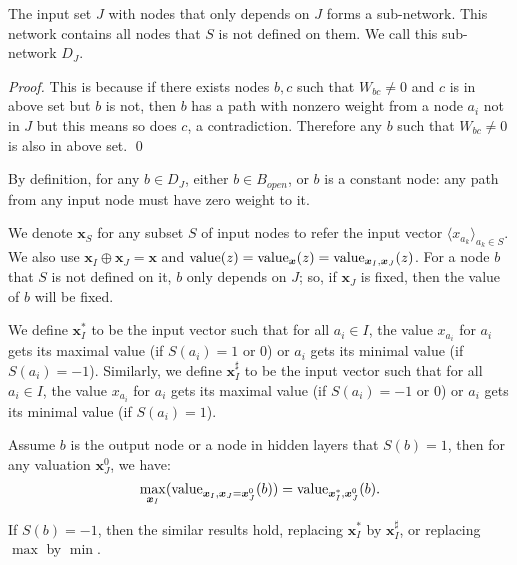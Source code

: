 			\begin{lemma}\label{lem:subnetwork2}
				The input set $J$ with nodes that only depends on $J$ forms a sub-network. This network contains all nodes that $S$ is not defined on them. We call this sub-network $D_J$.
			\end{lemma}
			
			\begin{proof}
				This is because if there exists nodes $b,c$ such that $W_{bc}\neq 0$ and $c$ is in above set but $b$ is not, then $b$ has a path with nonzero weight from a node $a_i$ not in $J$ but this means so does $c$, a contradiction. Therefore any $b$ such that $W_{bc}\neq 0$ is also in above set. \qed
			\end{proof}
			
			By definition, for any $b\in D_J$, either $b\in B_{open}$, or $b$ is a constant node:  any path from any input node must have zero weight to it.
			
			We denote $\boldsymbol{x}_S$ for any subset $S$ of input nodes to refer the input vector $\langle x_{a_k}\rangle_{a_k\in S}$. We also use $\boldsymbol{x}_I\oplus \boldsymbol{x}_J = \boldsymbol{x}$ and ${\textrm{value}}(z)={\textrm{value}}_{\boldsymbol{x}}(z)={\textrm{value}}_{\boldsymbol{x}_I,\boldsymbol{x}_J} (z)$. For a node $b$ that $S$ is not defined on it, $b$ only depends on $J$; so, if $\boldsymbol{x}_J$ is fixed, then the value of $b$ will be fixed.
			
			We define $\boldsymbol{x}_I^*$ to be the input vector such that for all $a_i \in I$, the value $x_{a_i}$ for $a_i$ gets its maximal value (if $S(a_i)=1$ or $0$) or $a_i$ gets its minimal value (if $S(a_i)=-1$). Similarly, we define $\boldsymbol{x}_I^\sharp$ to be the input vector such that for all $a_i \in I$, the value $x_{a_i}$ for $a_i$ gets its maximal value (if $S(a_i)=-1$ or $0$) or $a_i$ gets its minimal value (if $S(a_i)=1$).
			
			
			
			\begin{lemma} \label{lem:reach_max_2}
				
				Assume $b$ is the output node or a node in hidden layers that $S(b)=1$, then   for any valuation $\boldsymbol{x}^0_J$, 
				we have: $$\max_{\boldsymbol{x}_I} ({\textrm{value}}_{\boldsymbol{x}_I,\boldsymbol{x}_J=\boldsymbol{x}^0_J}(b)) =  {\textrm{value}}_{\boldsymbol{x}_I^*,\boldsymbol{x}^0_J}(b).$$
				
				
				
				
				
				If $S(b)=-1$, then the similar results hold, replacing $\boldsymbol{x}^*_I$ by $\boldsymbol{x}^\sharp_I$, or replacing $\max$ by $\min$. 
			\end{lemma}
			
